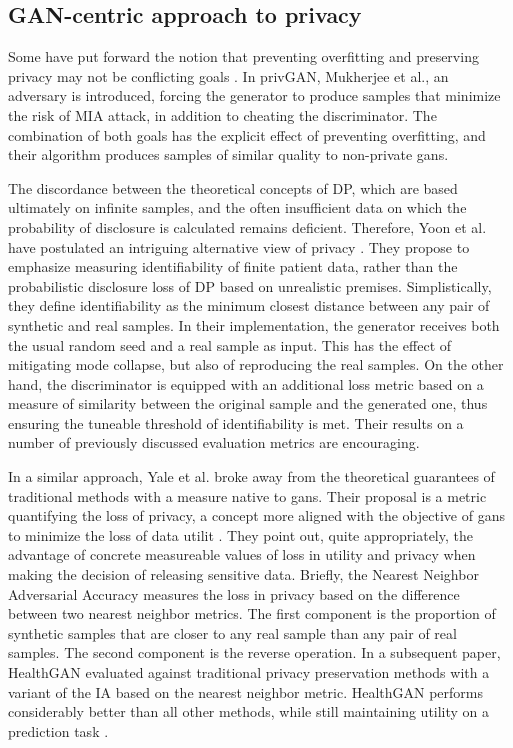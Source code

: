 \subsection{GAN-centric approach to privacy}
Some have put forward the notion that preventing overfitting and preserving privacy may not be conflicting goals \cite{Wu2019-ui,Mukherjee2019-vu}. In privGAN, Mukherjee et al., an adversary is introduced, forcing the generator to produce samples that minimize the risk of MIA attack, in addition to cheating the discriminator. The combination of both goals has the explicit effect of preventing overfitting, and their algorithm produces samples of similar quality to non-private \glspl{gan}.\par
The discordance between the theoretical concepts of DP, which are  based ultimately on infinite samples, and the often insufficient data on which the probability of disclosure is calculated remains deficient. Therefore, Yoon et al. have postulated an intriguing alternative view of privacy \cite{Yoon2020}. They propose to emphasize measuring identifiability of finite patient data, rather than the probabilistic disclosure loss of DP based on unrealistic premises. Simplistically, they define identifiability as the minimum closest distance between any pair of synthetic and real samples. In their implementation, the generator receives both the usual random seed and a real sample as input. This has the effect of mitigating mode collapse, but also of reproducing the real samples. On the other hand, the discriminator is equipped with an additional loss metric based on a measure of similarity between the original sample and the generated one, thus ensuring the tuneable threshold of identifiability is met. Their results on a number of previously discussed evaluation metrics are encouraging.\par
In a similar approach, Yale et al. broke away from the theoretical guarantees of traditional methods with a measure native to \glspl{gan}. Their proposal is a metric quantifying the loss of privacy, a concept more aligned with the objective of \glspl{gan} to minimize the loss of data utilit \cite{yale:hal-02160496,p2019}. They point out, quite appropriately, the advantage of concrete measureable values of loss in utility and privacy when making the decision of releasing sensitive data. Briefly, the Nearest Neighbor Adversarial Accuracy measures the loss in privacy based on the difference between two nearest neighbor metrics. The  first component is the proportion of synthetic samples that are closer to any real sample than any pair of real samples. The second component is the reverse operation. In a subsequent paper, HealthGAN evaluated against traditional privacy preservation methods with a variant of the IA based on the nearest neighbor metric. HealthGAN performs considerably better than all other methods, while still maintaining utility on a prediction task .

